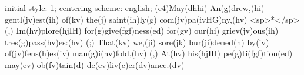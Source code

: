 initial-style: 1;
centering-scheme: english;
(c4)May(dhhi) An(g)drew,(hi) gentl(jv)est(ih) of(kv) the(j) saint(ih)ly(g) com(jv)pa(ivHG)ny,(hv) <sp>*</sp> (,)
Im(hv)plore(hjIH) for(g)give(fgf)ness(ed) for(gv) our(hi) griev(jv)ous(ih) tres(g)pass(hv)es:(hv) (;)
That(kv) we,(ji) sore(jk) bur(ji)dened(h) by(iv) of(jv)fens(h)es(iv) man(g)i(hv)fold,(hv) (,)
At(hv) his(hjIH) pe(g)ti(fgf)tion(ed) may(ev) ob(fv)tain(d) de(ev)liv(c)er(dv)ance.(dv)
